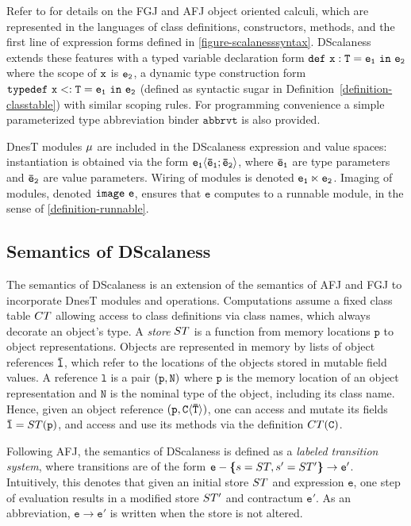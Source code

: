 Refer to \cite{FJ,AFJ} for details on the FGJ and AFJ object oriented calculi,
which are represented in the languages of class definitions, constructors, methods, and the
first line of expression forms defined in \autoref{figure-scalanesssyntax}. DScalaness extends
these features with a typed variable declaration form $\jdef{x}{T}{e_1}{e_2}$ where the scope of
$\tt{x}$ is $\tt{e_2}$, a dynamic type construction form $\jtlet{x}{T}{e_1}{e_2}$ (defined as
syntactic sugar in Definition~\autoref{definition-classtable}) with similar scoping rules. For
programming convenience a simple parameterized type abbreviation binder $\texttt{abbrvt}$ is
also provided.

DnesT modules $\jmodval$ are included in the DScalaness expression and value spaces:
instantiation is obtained via the form $\jinst{e_1}{\ttvec{e}_1; \ttvec{e}_2}$, where
$\ttvec{e}_\texttt{1}$ are type parameters and $\ttvec{e}_\texttt{2}$ are value parameters.
Wiring of modules is denoted $\jwire{\tt{e_1}}{\tt{e_2}}$. Imaging of modules, denoted
$\jimage{\texttt{e}}$, ensures that $\texttt{e}$ computes to a runnable module, in the sense of
\autoref{definition-runnable}.

\subsection{Semantics of DScalaness}
\label{section-dscalaness-semantics}

The semantics of DScalaness is an extension of the semantics of AFJ and FGJ to incorporate DnesT
modules and operations. Computations assume a fixed class table $\CT$ allowing access to class
definitions via class names, which always decorate an object's type. A \emph{store} $\jstore$ is
a function from memory locations $\texttt{p}$ to object representations. Objects are represented
in memory by lists of object references $\ttvec{l}$, which refer to the locations of the objects
stored in mutable field values. A reference $\texttt{l}$ is a pair $\jref{\texttt{p}}{N}$ where
$\texttt{p}$ is the memory location of an object representation and $\texttt{N}$ is the nominal
type of the object, including its class name. Hence, given an object reference
$\jref{\texttt{p}}{\jinst{C}{\ttvec{T}}}$, one can access and mutate its fields $\ttvec{l} =
\jstore(\texttt{p})$, and access and use its methods via the definition $\CT(\texttt{C})$.

Following AFJ, the semantics of DScalaness is defined as a \emph{labeled transition system},
where transitions are of the form $\texttt{e} - \lc s = \jstore, s' = \jstore' \rc \rightarrow
\texttt{e}' $. Intuitively, this denotes that given an initial store $\jstore$ and expression
$\texttt{e}$, one step of evaluation results in a modified store $\jstore'$ and contractum
$\texttt{e}'$. As an abbreviation, $\texttt{e} \rightarrow \texttt{e}'$ is written when the
store is not altered.

